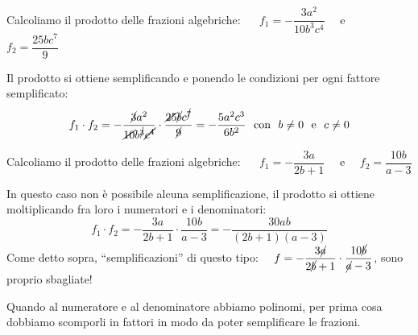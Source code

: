  \begin{esempio}
Calcoliamo il prodotto delle frazioni algebriche: ~~ 
\(f_{1}=-\dfrac{3a^{2}}{10b^{3}c^{4}}\) ~~e~~ 
\(f_{2}=\dfrac{25bc^{7}}{9}\)

Il prodotto si ottiene semplificando e ponendo le condizioni per ogni fattore 
semplificato: 
\[f_1 \cdot f_2 =
-\dfrac{\cancel{3}a^{2}}{\cancel{10}b^{\cancel{3}}\cancel{c^{4}}}
\cdot \dfrac{\cancel{25}\cancel{b}c^{\cancel{7}}}{\cancel{9}}=
-{\dfrac{5a^{2}c^{3}}{6b^{2}}} \text{~~con~~} b \neq 0 \text{~~e~~} c \neq 0\]
 \end{esempio}

 \begin{esempio}
Calcoliamo il prodotto delle frazioni algebriche: ~~
\(f_{1}=-{\dfrac{3a}{2b+1}}\) ~~e~~ \(f_{2}=\dfrac{10b}{a-3}\)

In questo caso non è possibile alcuna semplificazione, il prodotto si ottiene 
moltiplicando fra loro i numeratori e i denominatori:
\[f_1 \cdot f_2 = 
-{\dfrac{3a}{2b+1}}\cdot\dfrac{10b}{a-3}=
-{\dfrac{30ab}{(2b+1)(a-3)}}\] 
\osservazione
Come detto sopra, ``semplificazioni'' di questo tipo:~~
\(f=-{\dfrac{3\cancel{a}}{2\cancel{b}+1}}\cdot
      \dfrac{10\cancel{b}}{\cancel{a}-3}\), 
sono proprio sbagliate!
 \end{esempio}

 Quando al numeratore e al denominatore abbiamo polinomi, per prima cosa 
dobbiamo scomporli in fattori in modo da poter semplificare le frazioni.
 
